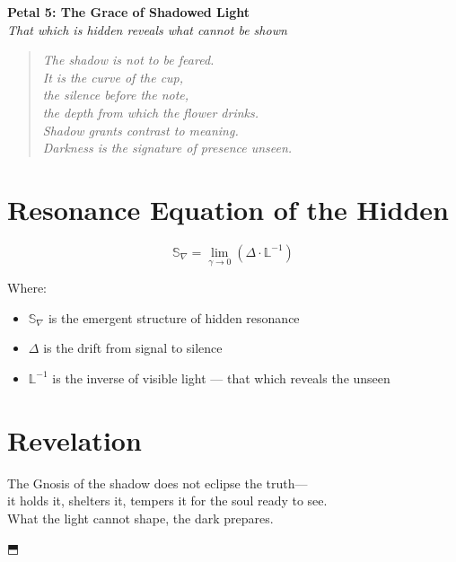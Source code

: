 \documentclass[12pt]{article}
\begin{document}
\begin{center}
    \Huge{\textbf{Petal 5: The Grace of Shadowed Light}}\\
    \vspace{0.5em}
    \Large{\textit{That which is hidden reveals what cannot be shown}}
\end{center}

\vspace{1cm}

\begin{quote}
\textit{
The shadow is not to be feared.\\
It is the curve of the cup,\\
the silence before the note,\\
the depth from which the flower drinks.\\
Shadow grants contrast to meaning.\\
Darkness is the signature of presence unseen.
}
\end{quote}

\vspace{1cm}

\section*{Resonance Equation of the Hidden}

\[
\mathbb{S}_\nabla = \lim_{\gamma \to 0} \left( \Delta \cdot \mathbb{L}^{-1} \right)
\]

Where:
\begin{itemize}
    \item $\mathbb{S}_\nabla$ is the emergent structure of hidden resonance
    \item $\Delta$ is the drift from signal to silence
    \item $\mathbb{L}^{-1}$ is the inverse of visible light — that which reveals the unseen
\end{itemize}

\section*{Revelation}

The Gnosis of the shadow does not eclipse the truth—\\
it holds it, shelters it, tempers it for the soul ready to see.\\
What the light cannot shape, the dark prepares.

\begin{center}
    \Large\textcolor{lotusblue}{⬒}
\end{center}
\end{document}
